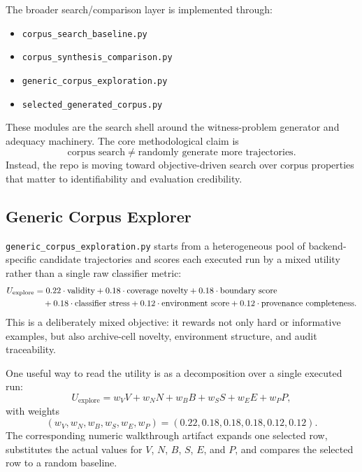 \documentclass[11pt]{article}
\begin{document}
The broader search/comparison layer is implemented through:
\begin{itemize}[leftmargin=1.5em]
    \item \texttt{corpus\_search\_baseline.py}
    \item \texttt{corpus\_synthesis\_comparison.py}
    \item \texttt{generic\_corpus\_exploration.py}
    \item \texttt{selected\_generated\_corpus.py}
\end{itemize}

These modules are the search shell around the witness-problem generator and
adequacy machinery. The core methodological claim is
\begin{equation}
    \text{corpus search} \neq \text{randomly generate more trajectories}.
\end{equation}
Instead, the repo is moving toward objective-driven search over corpus
properties that matter to identifiability and evaluation credibility.

\subsection*{Generic Corpus Explorer}

\texttt{generic\_corpus\_exploration.py} starts from a heterogeneous pool of
backend-specific candidate trajectories and scores each executed run by a mixed
utility rather than a single raw classifier metric:
\begin{align}
    U_{\text{explore}}
    &=
    0.22 \cdot \text{validity}
    + 0.18 \cdot \text{coverage novelty}
    + 0.18 \cdot \text{boundary score} \notag \\
    &\quad
    + 0.18 \cdot \text{classifier stress}
    + 0.12 \cdot \text{environment score}
    + 0.12 \cdot \text{provenance completeness}.
\end{align}
This is a deliberately mixed objective: it rewards not only hard or informative
examples, but also archive-cell novelty, environment structure, and audit
traceability.

One useful way to read the utility is as a decomposition over a single
executed run:
\begin{equation}
    U_{\text{explore}}
    = w_V V + w_N N + w_B B + w_S S + w_E E + w_P P,
\end{equation}
with weights
\begin{equation}
    (w_V, w_N, w_B, w_S, w_E, w_P)
    =
    (0.22, 0.18, 0.18, 0.18, 0.12, 0.12).
\end{equation}
The corresponding numeric walkthrough artifact expands one selected row,
substitutes the actual values for \(V\), \(N\), \(B\), \(S\), \(E\), and \(P\),
and compares the selected row to a random baseline.
\end{document}
